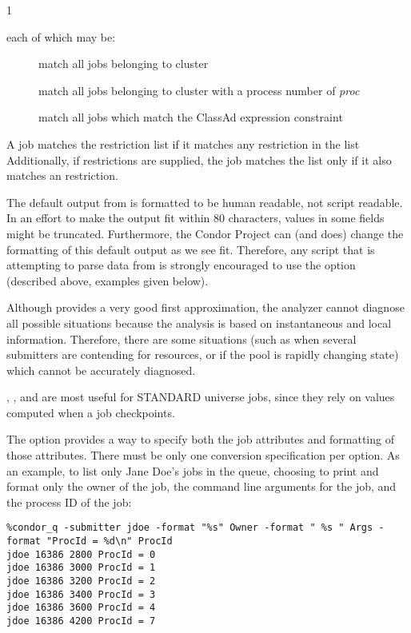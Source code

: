 \begin{ManPage}{\label{man-condor-q}}{1}
\begin{Options}
{    each of which may be:
        \begin{description}
        \item[] match all jobs belonging to cluster
        \item[] match all jobs belonging to cluster with
        a process number of \emph{proc}
        \item[] match all jobs which match
        the ClassAd expression constraint
        \end{description} 
    A job matches the restriction list if it matches any restriction in the 
    list  Additionally, if  restrictions are supplied, the job
    matches the list only if it also matches an  restriction.}
\end{Options}

\GenRem

The default output from  is formatted to be human readable,
not script readable.
In an effort to make the output fit within 80 characters, values in
some fields might be truncated.
Furthermore, the Condor Project can (and does) change the formatting
of this default output as we see fit.
Therefore, any script that is attempting to parse data from 
is strongly encouraged to use the  option (described
above, examples given below).

Although  provides a very good first approximation, the analyzer 
cannot diagnose all possible situations because the analysis is based on 
instantaneous and local information.  Therefore, there are some situations 
(such as when several submitters are contending for resources, or if the pool 
is rapidly changing state) which cannot be accurately diagnosed.

, , and  are most useful for STANDARD
universe jobs, since they rely on values computed when a job
checkpoints.

\Examples

The  option provides a way to specify both the job attributes
and formatting of those attributes.
There must be only one conversion specification per  option.
As an example, to list only Jane Doe's jobs in the queue,
choosing to print and format only the owner of the job,
the command line arguments for the job, and the
process ID of the job:
\footnotesize
\begin{verbatim}
%condor_q -submitter jdoe -format "%s" Owner -format " %s " Args -format "ProcId = %d\n" ProcId
jdoe 16386 2800 ProcId = 0
jdoe 16386 3000 ProcId = 1
jdoe 16386 3200 ProcId = 2
jdoe 16386 3400 ProcId = 3
jdoe 16386 3600 ProcId = 4
jdoe 16386 4200 ProcId = 7
\end{verbatim}
\normalsize


\end{ManPage}
